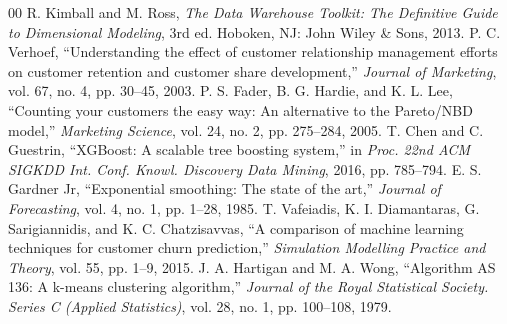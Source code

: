 \documentclass[conference]{IEEEtran}
\begin{document}
\balance
\begin{thebibliography}{00}
 R. Kimball and M. Ross, \textit{The Data Warehouse Toolkit: The Definitive Guide to Dimensional Modeling}, 3rd ed. Hoboken, NJ: John Wiley \& Sons, 2013.
 P. C. Verhoef, ``Understanding the effect of customer relationship management efforts on customer retention and customer share development,'' \textit{Journal of Marketing}, vol. 67, no. 4, pp. 30--45, 2003.
 P. S. Fader, B. G. Hardie, and K. L. Lee, ``Counting your customers the easy way: An alternative to the Pareto/NBD model,'' \textit{Marketing Science}, vol. 24, no. 2, pp. 275--284, 2005.
 T. Chen and C. Guestrin, ``XGBoost: A scalable tree boosting system,'' in \textit{Proc. 22nd ACM SIGKDD Int. Conf. Knowl. Discovery Data Mining}, 2016, pp. 785--794.
 E. S. Gardner Jr, ``Exponential smoothing: The state of the art,'' \textit{Journal of Forecasting}, vol. 4, no. 1, pp. 1--28, 1985.
 T. Vafeiadis, K. I. Diamantaras, G. Sarigiannidis, and K. C. Chatzisavvas, ``A comparison of machine learning techniques for customer churn prediction,'' \textit{Simulation Modelling Practice and Theory}, vol. 55, pp. 1--9, 2015.
 J. A. Hartigan and M. A. Wong, ``Algorithm AS 136: A k-means clustering algorithm,'' \textit{Journal of the Royal Statistical Society. Series C (Applied Statistics)}, vol. 28, no. 1, pp. 100--108, 1979.
\end{thebibliography}
\end{document}
